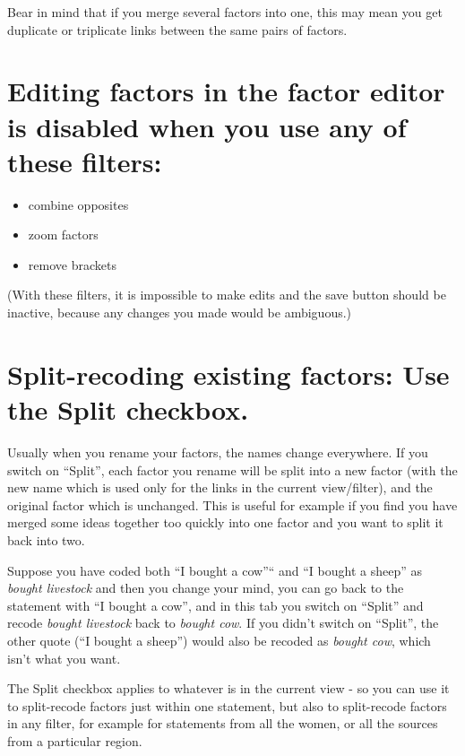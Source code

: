 \documentclass[
]{book}
\providecommand{\tightlist}{%
  \setlength{\itemsep}{0pt}\setlength{\parskip}{0pt}}
\begin{document}
Bear in mind that if you merge several factors into one, this may mean you get duplicate or triplicate links between the same pairs of factors.

\hypertarget{editing-factors-in-the-factor-editor-is-disabled-when-you-use-any-of-these-filters}{%
\section{Editing factors in the factor editor is disabled when you use any of these filters:}\label{editing-factors-in-the-factor-editor-is-disabled-when-you-use-any-of-these-filters}}

\begin{itemize}
\tightlist
\item
  combine opposites
\item
  zoom factors
\item
  remove brackets
\end{itemize}

(With these filters, it is impossible to make edits and the save button should be inactive, because any changes you made would be ambiguous.)

\hypertarget{split-recoding}{%
\section{\texorpdfstring{Split-recoding existing factors: Use the \textbf{Split} checkbox.}{Split-recoding existing factors: Use the Split checkbox.}}\label{split-recoding}}

Usually when you rename your factors, the names change everywhere. If you switch on ``Split'', each factor you rename will be split into a new factor (with the new name which is used only for the links in the current view/filter), and the original factor which is unchanged. This is useful for example if you find you have merged some ideas together too quickly into one factor and you want to split it back into two.

Suppose you have coded both ``I bought a cow''`` and ``I bought a sheep'' as \emph{bought livestock} and then you change your mind, you can go back to the statement with ``I bought a cow'', and in this tab you switch on ``Split'' and recode \emph{bought livestock} back to \emph{bought cow}. If you didn't switch on ``Split'', the other quote (``I bought a sheep'') would also be recoded as \emph{bought cow}, which isn't what you want.

The Split checkbox applies to whatever is in the current view - so you can use it to split-recode factors just within one statement, but also to split-recode factors in any filter, for example for statements from all the women, or all the sources from a particular region.
\end{document}
